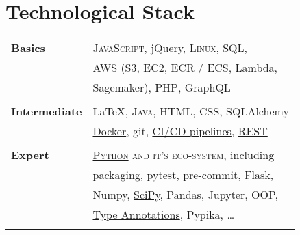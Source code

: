 \documentclass[a4paper,10pt]{article} %
\begin{document}
{\begin{minipage}[t]{0.44\textwidth}

\section{Technological Stack}

\begin{tabular}{ll}
\textbf{Basics}& \textsc{JavaScript}, jQuery, \textsc{Linux}, \textsc{SQL}, \\
               & AWS (S3, EC2, ECR / ECS, Lambda, \\
               & Sagemaker), \textsc{PHP}, GraphQL\\ \\
\textbf{Intermediate} & \LaTeX, \textsc{Java}, \textsc{HTML}, \textsc{CSS}, SQLAlchemy\\
               & \href{https://martin-thoma.com/docker/}{Docker}, git, \href{https://levelup.gitconnected.com/ci-pipelines-for-python-projects-9ac2830d2e38}{CI/CD pipelines}, \href{https://martin-thoma.com/rest/}{REST}\\ \\
\textbf{Expert} & \textsc{\href{https://stackoverflow.com/help/badges/51/python?userid=562769}{Python} and it's eco-system}, including\\
               & packaging, \href{https://medium.com/swlh/unit-testing-in-python-basics-21a9a57418a0}{pytest}, \href{https://towardsdatascience.com/pre-commit-hooks-you-must-know-ff247f5feb7e}{pre-commit}, \href{https://medium.com/analytics-vidhya/how-to-test-flask-applications-aef12ae5181c}{Flask},\\
               & Numpy, \href{https://arxiv.org/pdf/1907.10121.pdf}{SciPy}, Pandas, Jupyter, OOP, \\
               & \href{https://medium.com/analytics-vidhya/type-annotations-in-python-3-8-3b401384403d}{Type Annotations}, Pypika, \dots\\ \\
\end{tabular}



\end{minipage}}
\end{document}
